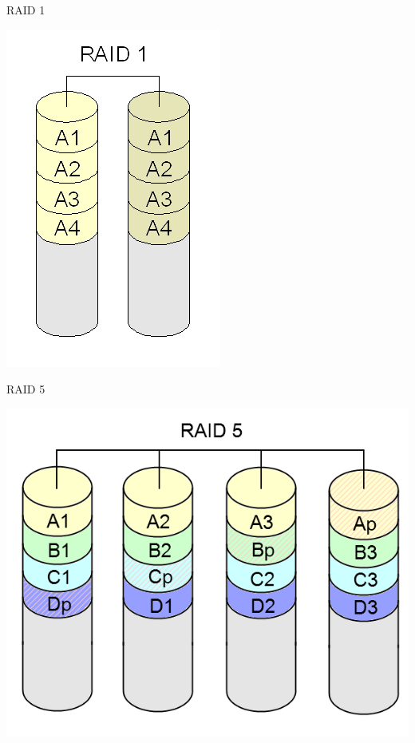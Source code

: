 \begin{frame}{RAID 1}
  
  \includegraphics[scale=.3]{../img/raid1.png}

\end{frame}


\begin{frame}{RAID 5}
  
  \includegraphics[scale=.3]{../img/raid5.png}

\end{frame}

